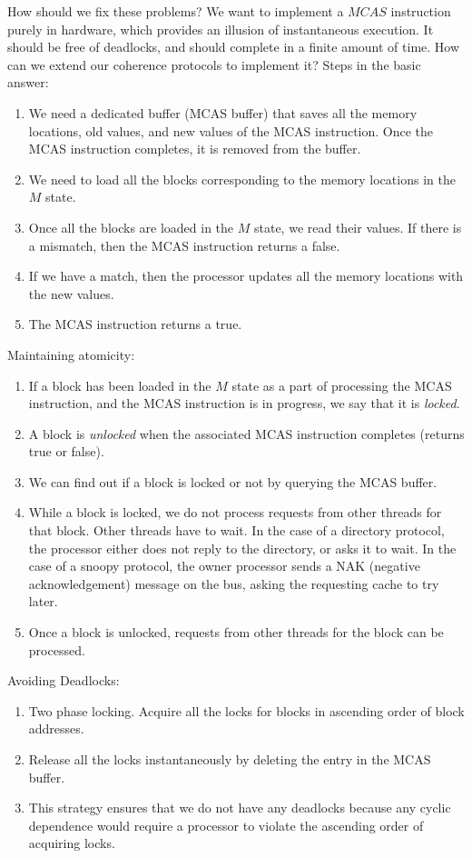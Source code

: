 \begin{ExerciseList}
How should we fix these problems? We want to implement a $MCAS$ instruction purely in hardware,
which provides an illusion of instantaneous execution. It should be free of deadlocks, and should
complete in a finite amount of time. How can we extend our coherence protocols to implement it?
\Answer
Steps in the basic answer: 
\begin{enumerate}
\item We need a dedicated buffer (MCAS buffer) that saves all the memory locations, old values, and new values of
the MCAS instruction. Once the MCAS instruction completes, it is removed from the buffer.
\item We need to load all the blocks corresponding to the memory locations  in the $M$ state. 
\item Once all the blocks are loaded in the $M$ state, we read their values.
If there is a mismatch, then the MCAS instruction returns a false. 
\item If we have a match, then the processor updates all the memory locations with the new values.
\item The MCAS instruction returns a true.
\end{enumerate}

Maintaining atomicity: 
\begin{enumerate}
\item If a block has been loaded in the $M$ state as a part of processing the MCAS instruction,
 and the MCAS instruction is in progress, we
say that it is {\em locked}. 
\item A block is {\em unlocked} when the associated MCAS instruction completes (returns true or false).
\item We can find out if a block is locked or not by querying the MCAS buffer.
\item While a block is locked, we do not process requests from other threads for that block. Other threads have to wait.
In the case of a directory protocol, the processor either does not reply to the directory, or asks it to
wait. In the case of a snoopy protocol, the owner processor sends a NAK (negative acknowledgement) message
on the bus, asking the requesting cache to try later.
\item Once a block is unlocked, requests from other threads for the block can be processed.
\end{enumerate}


Avoiding Deadlocks: 
\begin{enumerate}
\item Two phase locking. Acquire all the locks for blocks in ascending order of block addresses.
\item Release all the locks instantaneously by deleting the entry in the MCAS buffer.
\item This strategy ensures that we do not have any deadlocks because any cyclic dependence would require
a processor to violate the ascending order of acquiring locks.
\end{enumerate}



\end{ExerciseList}
